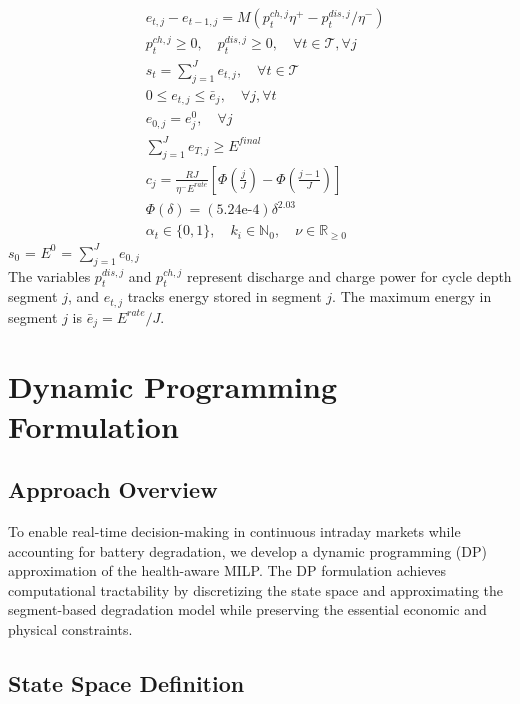 \documentclass[10pt,twocolumn]{article}
\begin{document}
\begin{subequations}
\begin{align}
& e_{t,j} - e_{t-1,j} = M(p_t^{ch,j} \eta^+ - p_t^{dis,j}/\eta^-) \label{eq:segment_evolution} \\
& p_t^{ch,j} \geq 0, \quad p_t^{dis,j} \geq 0, \quad \forall t \in \mathcal{T}, \forall j \\
& s_t = \sum_{j=1}^J e_{t,j}, \quad \forall t \in \mathcal{T} \label{eq:total_storage_sum} \\
& 0 \leq e_{t,j} \leq \bar{e}_j, \quad \forall j, \forall t \label{eq:segment_limit} \\
& e_{0,j} = e^{0}_j, \quad \forall j \label{eq:segment_limit} \\
& \sum_{j=1}^J e_{T,j} \geq E^{final} \quad \label{eq:total_charge} \\
& c_j = \frac{R J}{\eta^{-} E^{rate}} \left[ \Phi\left(\frac{j}{J}\right) - \Phi\left(\frac{j-1}{J}\right) \right] \label{eq:cycle_cost} \\
& \Phi(\delta) = (5.24\text{e-4})\delta^{2.03} \label{eq:phi_func} \\
& \alpha_t \in \{0,1\}, \quad k_i \in \mathbb{N}_0, \quad \nu \in \mathbb{R}_{\geq 0} \label{eq:binary_integer}
\end{align}
\label{eq:health_aware_milp}
\end{subequations}
$s_{0}$ = $E^{0}$ = $\sum_{j=1}^J e_{0,j}$ \quad \\
The variables $p_t^{dis,j}$ and $p_t^{ch,j}$ represent discharge and charge power for cycle depth segment $j$, and $e_{t,j}$ tracks energy stored in segment $j$. The maximum energy in segment $j$ is $\bar{e}_j = E^{rate}/J$.

\section{Dynamic Programming Formulation }

\subsection{Approach Overview}

To enable real-time decision-making in continuous intraday markets while accounting for battery degradation, we develop a dynamic programming (DP) approximation of the health-aware MILP. The DP formulation achieves computational tractability by discretizing the state space and approximating the segment-based degradation model while preserving the essential economic and physical constraints.

\subsection{State Space Definition}
\end{document}
